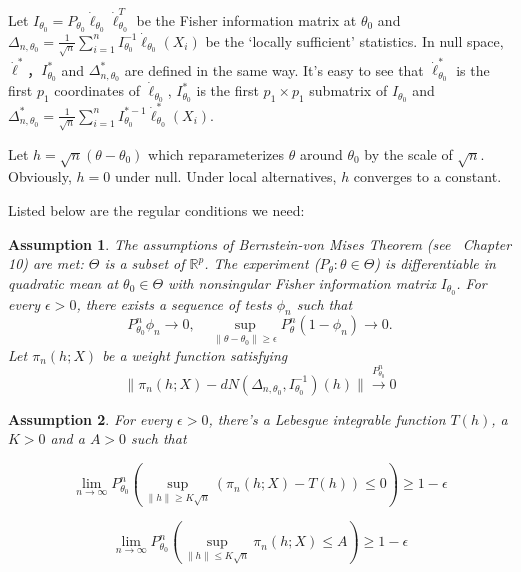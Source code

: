 \documentclass[review]{elsarticle}
\newtheorem{assumption}{\quad\quad Assumption}
\begin{document}
Let $I_{\theta_0}=P_{\theta_0}\dot{\ell}_{\theta_0}\dot{\ell}_{\theta_0}^T$ be the Fisher information matrix at $\theta_0$ and $\Delta_{n,\theta_0}=\frac{1}{\sqrt{n}}\sum_{i=1}^n I_{\theta_0}^{-1}\dot{\ell}_{\theta_0}(X_i)$ be the `locally sufficient' statistics. In null space, $\dot{\ell}^*$，$I^*_{\theta_0}$ and $\Delta_{n,\theta_0}^*$ are defined in the same way. It's easy to see that $\dot{\ell}^*_{\theta_0}$ is the first $p_1$
coordinates of $\dot{\ell}_{\theta_0}$, $I^*_{\theta_0}$ is the  first $p_1\times p_1$ submatrix of $I_{\theta_0}$ and $\Delta_{n,\theta_0}^*=\frac{1}{\sqrt{n}}\sum_{i=1}^n I_{\theta_0}^{*-1}\dot{\ell}^*_{\theta_0}(X_i)$.

Let $h=\sqrt{n}(\theta-\theta_0)$ which reparameterizes $\theta$ around $\theta_0$ by the scale of $\sqrt{n}$.  Obviously, $h=0$ under null. Under local alternatives, $h$ converges to a constant.

Listed below are the regular conditions we need:

\begin{assumption}\label{Assumption1}
    The assumptions of Bernstein-von Mises Theorem (see~\cite{van2000asymptotic} Chapter 10) are met:  $\Theta$ is a subset of $\mathbb{R}^p$. The experiment ($P_{\theta}:\theta\in\Theta$) is differentiable in quadratic mean at $\theta_0\in \Theta$ with nonsingular Fisher information matrix $I_{\theta_0}$. For every $\epsilon>0$, there exists a sequence of tests $\phi_n$ such that
        \begin{equation}
            P_{\theta_0}^n\phi_n\to 0,\quad \sup_{\|\theta-\theta_0\|\geq \epsilon} P_\theta^n(1-\phi_n)\to 0.
        \end{equation}
        Let $\pi_n(h;X)$ be a weight function satisfying 
        \begin{equation}\label{vonMisesResults}
            \|\pi_n(h;X)-dN(\Delta_{n,\theta_0},I_{\theta_0}^{-1})(h)\|\overset{P_{\theta_0}^n}{\to}0
        \end{equation}
\end{assumption}     
        
\begin{assumption}\label{Assumption2}
        For every $\epsilon>0$, there's a Lebesgue integrable function $T(h)$, a $K>0$ and a $A>0$ such that 

    \begin{equation}\label{Assump21}
    \lim_{n\to \infty}P_{\theta_0}^n(\sup_{\|h\|\geq K\sqrt{n}}(\pi_n(h;X)-T(h))\leq 0)\geq 1-\epsilon
\end{equation}

        \begin{equation}\label{Assump22}
            \lim_{n\to \infty} P_{\theta_0}^n(\sup_{\|h\|\leq K\sqrt{n}} \pi_n(h;X)\leq A)\geq 1-\epsilon
        \end{equation}
\end{assumption}
\end{document}
